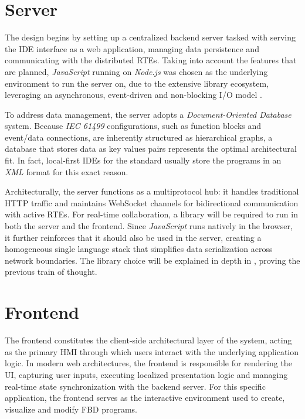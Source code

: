 \section{Server}
The design begins by setting up a centralized backend server tasked with serving the \ac{IDE} interface as a web application, managing data persistence and communicating with the distributed \acp{RTE}. Taking into account the features that are planned, \textit{JavaScript} running on \textit{Node.js} was chosen as the underlying environment to run the server on, due to the extensive library ecosystem, leveraging an asynchronous, event-driven and non-blocking I/O model \cite{sun_reasoning_2019}.

To address data management, the server adopts a \textit{Document-Oriented Database} system. Because \textit{IEC 61499} configurations, such as function blocks and event/data connections, are inherently structured as hierarchical graphs, a database that stores data as key values pairs represents the optimal architectural fit. In fact, local-first \acp{IDE} for the standard usually store the programs in an \textit{XML} format for this exact reason.

Architecturally, the server functions as a multiprotocol hub: it handles traditional HTTP traffic and maintains WebSocket channels for bidirectional communication with active \acp{RTE}. For real-time collaboration, a library will be required to run in both the server and the frontend. Since \textit{JavaScript} runs natively in the browser, it further reinforces that it should also be used in the server, creating a homogeneous single language stack that simplifies data serialization across network boundaries. The library choice will be explained in depth in , proving the previous train of thought.

\section{Frontend}
The frontend constitutes the client-side architectural layer of the system, acting as the primary \ac{HMI} through which users interact with the underlying application logic. In modern web architectures, the frontend is responsible for rendering the \ac{UI}, capturing user inputs, executing localized presentation logic and managing real-time state synchronization with the backend server. For this specific application, the frontend serves as the interactive environment used to create, visualize and modify \ac{FBD} programs.

